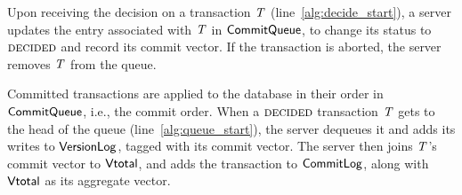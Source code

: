 Upon receiving the decision on a transaction $\mathit{T}$ (line~\ref{alg:decide_start}), a server updates the entry associated with $\mathit{T}$ in $\mathsf{CommitQueue}$, to change its status to $\text{\sc decided}$ and record its commit vector. If the transaction is aborted, the server removes $\mathit{T}$ from the queue.

Committed transactions are applied to the database in their order in $\mathsf{CommitQueue}$, i.e., the commit order. When a $\text{\sc decided}$ transaction $\mathit{T}$ gets to the head of the queue (line~\ref{alg:queue_start}), the server dequeues it and adds its writes to $\mathsf{VersionLog}$, tagged with its commit vector. The server then joins $\mathit{T}$'s commit vector to $\mathsf{Vtotal}$, and adds the transaction to $\mathsf{CommitLog}$, along with $\mathsf{Vtotal}$ as its aggregate vector.


